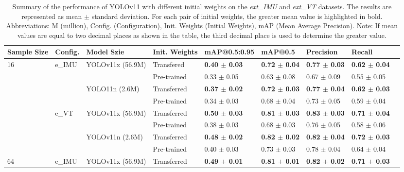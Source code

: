 \begin{table}[H]
    \caption{Summary of the performance of YOLOv11 with different initial weights on the \textit{ext\_IMU} and \textit{ext\_VT} datasets. The results are represented as mean $\pm$ standard deviation. For each pair of initial weights, the greater mean value is highlighted in bold. Abbreviations: M (million), Config. (Configuration), Init. Weights (Initial Weights), mAP (Mean Average Precision). Note: If mean values are equal to two decimal places as shown in the table, the third decimal place is used to determine the greater value.}
    \centering
    {\footnotesize
    \begin{tabular}{lllllllll}
        \toprule
        \textbf{Sample Size} & \textbf{Config.} & \textbf{Model Szie} & \textbf{Init. Weights} & \textbf{mAP@0.5:0.95} & \textbf{mAP@0.5} & \textbf{Precision} & \textbf{Recall} \\
        \midrule
            16  & e\_IMU & YOLOv11x (56.9M) & Transfered & \textbf{0.40 $\pm$ 0.03} & \textbf{0.72 $\pm$ 0.04} & \textbf{0.77 $\pm$ 0.03} & \textbf{0.62 $\pm$ 0.04} \\
                &        &               & Pre-trained & 0.33 $\pm$ 0.05 & 0.63 $\pm$ 0.08 & 0.67 $\pm$ 0.09 & 0.55 $\pm$ 0.05 \\
            \cmidrule{3-8}
                &        & YOLO11n (2.6M) & Transferred & \textbf{0.37 $\pm$ 0.02} & \textbf{0.72 $\pm$ 0.03} & \textbf{0.77 $\pm$ 0.04} & \textbf{0.62 $\pm$ 0.03} \\
                &        &               & Pre-trained & 0.34 $\pm$ 0.03 & 0.68 $\pm$ 0.04 & 0.73 $\pm$ 0.05 & 0.59 $\pm$ 0.04 \\
            \cmidrule{2-8}
                & e\_VT  & YOLOv11x (56.9M) & Transferred & \textbf{0.50 $\pm$ 0.03} & \textbf{0.81 $\pm$ 0.03} & \textbf{0.83 $\pm$ 0.03} & \textbf{0.71 $\pm$ 0.04} \\
                &        &               & Pre-trained & 0.38 $\pm$ 0.03 & 0.68 $\pm$ 0.03 & 0.76 $\pm$ 0.05 & 0.58 $\pm$ 0.06 \\
            \cmidrule{3-8}
                &        & YOLOv11n (2.6M) & Transferred & \textbf{0.48 $\pm$ 0.02} & \textbf{0.82 $\pm$ 0.02} & \textbf{0.82 $\pm$ 0.04} & \textbf{0.72 $\pm$ 0.03} \\
                &        &               & Pre-trained & 0.40 $\pm$ 0.03 & 0.73 $\pm$ 0.03 & 0.78 $\pm$ 0.04 & 0.64 $\pm$ 0.04 \\
            \midrule
            64  & e\_IMU & YOLOv11x (56.9M) & Transferred & \textbf{0.49 $\pm$ 0.01} & \textbf{0.81 $\pm$ 0.01} & \textbf{0.82 $\pm$ 0.02} & \textbf{0.71 $\pm$ 0.03} \\

\end{tabular}}
\end{table}
